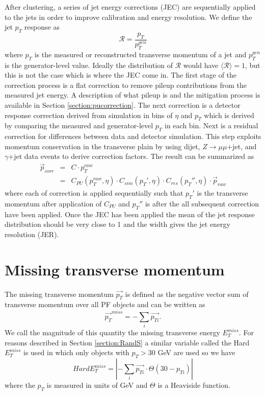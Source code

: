After clustering, a series of jet energy corrections (JEC) are sequentially applied to the jets in order to improve calibration and energy resolution. We define the jet $p_T$ response as 
\begin{equation}
	\mathcal{R} = \frac{p_{T}}{p_T^{gen}}
\end{equation}
where $p_T$ is the measured or reconstructed transverse momentum of a jet and $p_T^{gen}$ is the generator-level value.  Ideally the distribution of $\mathcal{R}$ would have $\langle \mathcal{R} \rangle = 1$, but this is not the case which is where the JEC come in.  The first stage of the correction process is a flat correction to remove pileup contributions from the measured jet energy.  A description of what pileup is and the mitigation process is available in Section \ref{section:pucorrection}.  The next correction is a detector response correction derived from simulation in bins of $\eta$ and $p_T$ which is derived by comparing the measured and generator-level $p_T$ in each bin.  Next is a residual correction for differences between data and detector simulation.  This step exploits momentum conservation in the transverse plain by using dijet, $Z\rightarrow \mu \mu$+jet, and $\gamma$+jet data events to derive correction factors.  The result can be summarized as
\begin{eqnarray}
	\vec{p}_{corr} &=& C \cdot p_T^{raw} \\
	 &=& C_{PU}(p_T^{raw},\eta)\cdot C_{sim}(p_T', \eta) \cdot C_{res}(p_T'', \eta) \cdot \vec{p}_{raw}
	 \label{equation:JEC}
\end{eqnarray}
where each of correction is applied sequentially such that $p_T'$ is the transverse momentum after application of $C_{PU}$ and $p_T''$ is after the all subsequent correction have been applied.  Once the JEC has been applied the mean of the jet response distribution should be very close to 1 and the width gives the jet energy resolution (JER).


\label{section:jetalgorithm}
\section{Missing transverse momentum}

The missing transverse momentum $\vec{p_T}$ is defined as the negative vector sum of transverse momentum over all PF objects and can be written as
\begin{equation}
	\vec{p_T}^{miss} = -\sum_{i}\vec{p_{Ti}}.
\end{equation}
We call the magnitude of this quantity the missing transverse energy $E_T^{miss}$.  For reasons described in Section \ref{section:RandS} a similar variable called the Hard $E_T^{miss}$ is used in which only objects with $p_T > 30$ GeV are used so we have 
\begin{equation}
	Hard E_T^{miss} = |-\sum_{i}\vec{p_{Ti}}\cdot \Theta(30 -p_{Ti})|
\end{equation}
where the $p_T$ is measured in units of GeV and $\Theta$ is a Heaviside function.

